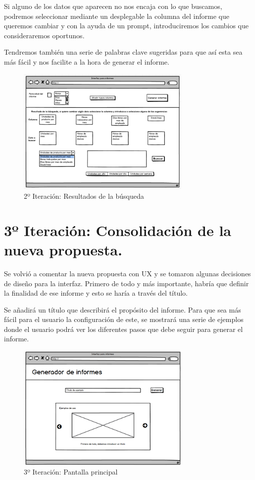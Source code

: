 Si alguno de los datos que aparecen no nos encaja con lo que buscamos, podremos seleccionar mediante un desplegable la columna 
del informe que queremos cambiar y con la ayuda de un prompt, introduciremos los cambios que consideraremos oportunos.

Tendremos también una serie de palabras clave sugeridas para que así esta sea más fácil y nos facilite a la hora de generar el informe.

\begin{figure}[hp!]
    \centering
    \includegraphics[width=0.75\textwidth]{imaxes/iteracion2.3.png}
    \caption{2º Iteración: Resultados de la búsqueda}
    \label{fig:iteracion2.3}
\end{figure}

\section{3º Iteración: Consolidación de la nueva propuesta.}

Se volvió a comentar la nueva propuesta con UX y se tomaron algunas decisiones de diseño para la interfaz. 
Primero de todo y más importante, habría que definir la finalidad de ese informe y esto se haría a través del título.

Se añadirá un título que describirá el propósito del informe. Para que sea más fácil para el usuario la configuración de este, 
se mostrará una serie de ejemplos donde el usuario podrá ver los diferentes pasos que debe seguir para generar el informe.

\begin{figure}[hp!]
    \centering
    \includegraphics[width=0.75\textwidth]{imaxes/iteracion3.1.png}
    \caption{3º Iteración: Pantalla principal}
    \label{fig:iteracion3.1}
\end{figure}

